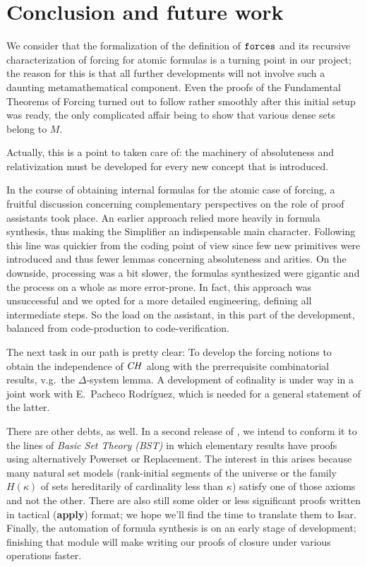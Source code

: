 \section{Conclusion and future work}
\label{sec:conclusion}

We consider that the formalization of the definition of $\mathop{\mathtt{forces}}$
and its recursive characterization of forcing for atomic formulas is
a turning point
in our project; the reason for this is that all further
developments will not involve such a daunting metamathematical
component. Even the proofs of the Fundamental Theorems of Forcing
turned out to follow rather smoothly after this initial setup was
ready, the only complicated affair being to show that various dense sets belong
to $M$. 
\begin{framed}
  Actually, this is a point to taken care of: the machinery of
  absoluteness and relativization must be developed for every new
  concept that is introduced.
\end{framed}

In the course of obtaining internal formulas for the atomic case of
forcing, a fruitful discussion
concerning complementary perspectives on the role of proof assistants
took place. An earlier approach relied more heavily in formula
synthesis, thus making the Simplifier an indispensable main
character. Following this line was quickier from the coding point of
view since few new primitives were introduced and thus fewer lemmas
concerning absoluteness and arities. On the downside, processing was a
bit slower, the formulas synthesized were gigantic and the process on
a whole as more error-prone. In fact, this approach was unsuccessful
and we opted for a more detailed engineering, defining all
intermediate steps. So the load on the assistant, in this part of the
development, balanced from code-production to code-verification. 

The next task in our path is pretty clear: To develop the forcing
notions to obtain the independence of $\mathit{CH}$ 
along with the prerrequisite combinatorial results, v.g.\ the
$\Delta$-system lemma. A development of cofinality is under way in a
joint work with E.~Pacheco Rodríguez, which is needed for a general
statement of the latter. 

There are other debts, as well. In a second
release of , we intend to conform it to the
lines of \emph{Basic Set Theory (BST)} \cite[I.3.1]{kunen2011set} in
which elementary results have proofs using alternatively Powerset or
Replacement. The interest in this arises because many natural set
models
(rank-initial segments of the universe or the family $H(\kappa)$ of
sets hereditarily of cardinality less than $\kappa$) satisfy one of
those axioms and not the other. There are also still some older or
less significant proofs written in tactical (\textbf{apply}) format; we
hope we'll find the time to translate them to Isar. Finally, the
automation of formula synthesis is on an early stage of
development;  finishing that module will make writing our proofs of closure
under various operations faster.

